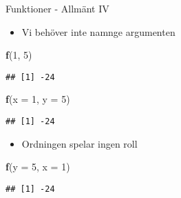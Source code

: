 \documentclass[
  11pt,
  ignorenonframetext,
]{beamer}
\newenvironment{Shaded}{\begin{snugshade}}{\end{snugshade}}
\newcommand{\AttributeTok}[1]{\textcolor[rgb]{0.13,0.29,0.53}{#1}}
\newcommand{\DecValTok}[1]{\textcolor[rgb]{0.00,0.00,0.81}{#1}}
\newcommand{\FunctionTok}[1]{\textcolor[rgb]{0.13,0.29,0.53}{\textbf{#1}}}
\newcommand{\NormalTok}[1]{#1}
\providecommand{\tightlist}{%
  \setlength{\itemsep}{0pt}\setlength{\parskip}{0pt}}
\begin{document}
\begin{frame}[fragile]{Funktioner - Allmänt IV}
\label{funktioner---allmuxe4nt-iv}
\begin{itemize}
\tightlist
\item
  Vi behöver inte namnge argumenten
\end{itemize}

\begin{Shaded}
\begin{Highlighting}[]
\FunctionTok{f}\NormalTok{(}\DecValTok{1}\NormalTok{, }\DecValTok{5}\NormalTok{)}
\end{Highlighting}
\end{Shaded}

\begin{verbatim}
## [1] -24
\end{verbatim}

\begin{Shaded}
\begin{Highlighting}[]
\FunctionTok{f}\NormalTok{(}\AttributeTok{x =} \DecValTok{1}\NormalTok{, }\AttributeTok{y =} \DecValTok{5}\NormalTok{)}
\end{Highlighting}
\end{Shaded}

\begin{verbatim}
## [1] -24
\end{verbatim}

\begin{itemize}
\tightlist
\item
  Ordningen spelar ingen roll
\end{itemize}

\begin{Shaded}
\begin{Highlighting}[]
\FunctionTok{f}\NormalTok{(}\AttributeTok{y =} \DecValTok{5}\NormalTok{, }\AttributeTok{x =} \DecValTok{1}\NormalTok{)}
\end{Highlighting}
\end{Shaded}

\begin{verbatim}
## [1] -24
\end{verbatim}
\end{frame}
\end{document}
